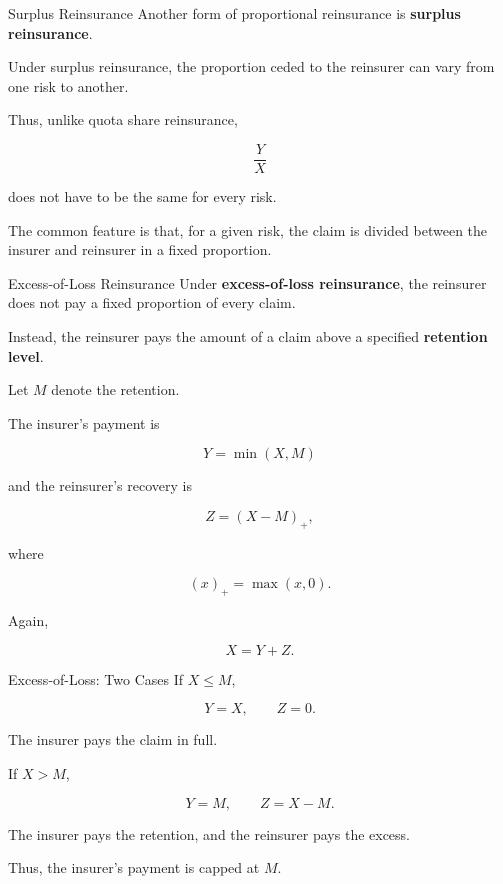 \documentclass[
  ignorenonframetext,
  aspectratio=169,
]{beamer}
\begin{document}
\begin{frame}{Surplus Reinsurance}
\protect{}\label{surplus-reinsurance}
Another form of proportional reinsurance is \textbf{surplus
reinsurance}.

Under surplus reinsurance, the proportion ceded to the reinsurer can
vary from one risk to another.

Thus, unlike quota share reinsurance,

\[
\frac{Y}{X}
\]

does not have to be the same for every risk.

The common feature is that, for a given risk, the claim is divided
between the insurer and reinsurer in a fixed proportion.
\end{frame}

\begin{frame}{Excess-of-Loss Reinsurance}
\protect{}\label{excess-of-loss-reinsurance-1}
Under \textbf{excess-of-loss reinsurance}, the reinsurer does not pay a
fixed proportion of every claim.

Instead, the reinsurer pays the amount of a claim above a specified
\textbf{retention level}.

Let \(M\) denote the retention.

The insurer's payment is

\[
\boxed{Y=\min(X,M)}
\]

and the reinsurer's recovery is

\[
\boxed{Z=(X-M)_+},
\]

where

\[
(x)_+=\max(x,0).
\]

Again,

\[
X=Y+Z.
\]
\end{frame}

\begin{frame}{Excess-of-Loss: Two Cases}
\protect{}\label{excess-of-loss-two-cases}
If \(X\leq M\),

\[
Y=X,
\qquad
Z=0.
\]

The insurer pays the claim in full.

If \(X>M\),

\[
Y=M,
\qquad
Z=X-M.
\]

The insurer pays the retention, and the reinsurer pays the excess.

Thus, the insurer's payment is capped at \(M\).
\end{frame}
\end{document}
